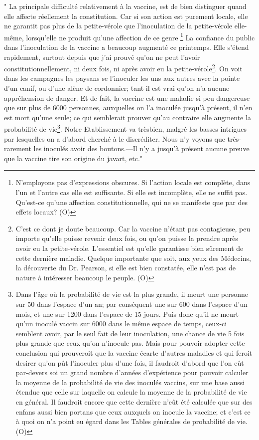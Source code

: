 \setcounter{page}{288} " La principale difficulté relativement à la vaccine, est de bien distinguer quand elle affecte réellement la constitution. Car si son action est purement locale, elle ne garantit pas plus de la petite-vérole que l’inoculation de la petite-vérole elle-même, lorsqu’elle ne produit qu’une affection de ce genre \footnote{N’employons pas d’expressions obscures. Si l’action locale est complète, dans l’un et l’autre cas elle est suffisante. Si elle est incomplète, elle ne suffit pas. Qu’est-ce qu’une affection constitutionnelle, qui ne se manifeste que par des effets locaux? (O)}
\setcounter{page}{289}
La confiance du public dans l'inoculation de la vaccine a beaucoup augmenté ce printemps. Elle s'étend rapidement, surtout depuis que j'ai prouvé qu'on ne peut l'avoir constitutionnellement, ni deux fois, ni après avoir eu la petite-vérole\footnote{C'est ce dont je doute beaucoup. Car la vaccine n'étant pas contagieuse, peu importe qu'elle puisse revenir deux fois, ou qu'on puisse la prendre après avoir eu la petite-vérole. L'essentiel est qu'elle garantisse bien sûrement de cette dernière maladie. Quelque importante que soit, aux yeux des Médecins, la découverte du Dr. Pearson, si elle est bien constatée, elle n'est pas de nature à intéresser beaucoup le peuple. (O)}. On voit dans les campagnes les paysans se l'inoculer les uns aux autres avec la pointe d'un canif, ou d'une alène de cordonnier; tant il est vrai qu'on n'a aucune appréhension de danger. Et de fait, la vaccine est une maladie si peu dangereuse que sur plus de 6000 personnes, auxquelles on l'a inoculée jusqu'à présent, il n'en est mort qu'une seule; ce qui semblerait prouver qu'au contraire elle augmente la probabilité de vie\footnote{Dans l'âge où la probabilité de vie est la plus grande, il meurt une personne sur 50 dans l'espace d'un an; par conséquent une sur 600 dans l'espace d'un mois, et une sur 1200 dans l'espace de 15 jours. Puis donc qu'il ne meurt qu'un inoculé vaccin sur 6000 dans le même espace de temps, ceux-ci semblent avoir, par le seul fait de leur inoculation, une chance de vie 5 fois plus grande que ceux qu'on n'inocule pas. Mais pour pouvoir adopter cette conclusion qui prouveroit que la vaccine écarte d'autres maladies et qui feroit desirer qu'on pût l'inoculer plus d'une fois, il faudroit d'abord que l'on eût par-devers soi un grand nombre d'années d'expérience pour pouvoir calculer la moyenne de la probabilité de vie des inoculés vaccins, sur une base aussi étendue que celle sur laquelle on calcule la moyenne de la probabilité de vie en général. Il faudroit encore que cette dernière n'eût été calculée que sur des enfans aussi bien portans que ceux auxquels on inocule la vaccine; et c'est ce à quoi on n'a point eu égard dans les Tables générales de probabilité de vie. (O)}. Notre Etablissement va trèsbien,\setcounter{page}{290} malgré les basses intrigues par lesquelles on a d'abord cherché à le discréditer. Nous n'y voyons que très-rarement les inoculés avoir des boutons.—Il n'y a jusqu'à présent aucune preuve que la vaccine tire son origine du javart, etc."

